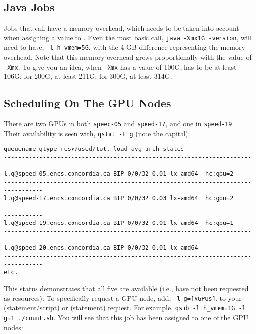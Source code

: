 \documentclass{easychair}
\begin{document}
\subsection{Java Jobs}

Jobs that call  have a memory overhead, which needs to be taken into account when assigning a value to . Even the most basic  call, \texttt{java -Xmx1G -version}, will need to have, \texttt{-l h\_vmem=5G}, with the 4-GB difference representing the memory overhead. Note that this memory overhead grows proportionally with the value of \texttt{-Xmx}. To give you an idea, when \texttt{-Xmx} has a value of 100G,  has to be at least 106G; for 200G, at least 211G; for 300G, at least 314G. 

\subsection{Scheduling On The GPU Nodes}

There are two GPUs in both \texttt{speed-05} and \texttt{speed-17}, and one in \texttt{speed-19}. Their availability is seen with, \texttt{qstat -F g} (note the capital): 

\small
\begin{verbatim}
queuename qtype resv/used/tot. load_avg arch states
---------------------------------------------------------------------------------
l.q@speed-05.encs.concordia.ca BIP 0/0/32 0.01 lx-amd64  hc:gpu=2 
--------------------------------------------------------------------------------- 
l.q@speed-17.encs.concordia.ca BIP 0/0/32 0.03 lx-amd64  hc:gpu=2 
--------------------------------------------------------------------------------- 
l.q@speed-19.encs.concordia.ca BIP 0/0/32 0.01 lx-amd64  hc:gpu=1 
--------------------------------------------------------------------------------- 
l.q@speed-20.encs.concordia.ca BIP 0/0/32 0.01 lx-amd64
--------------------------------------------------------------------------------- 
etc. 
\end{verbatim}
\normalsize

This status demonstrates that all five are available (i.e., have not been requested as resources). To specifically request a GPU node, add, \texttt{-l g=[\#GPUs]}, to your  (statement/script) or  (statement) request. For example, \texttt{qsub -l h\_vmem=1G -l g=1 ./count.sh}. You will see that this job has been assigned to one of the GPU nodes:
\end{document}
